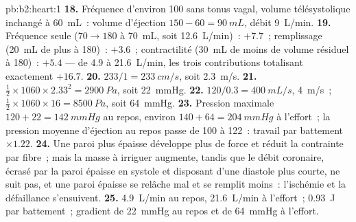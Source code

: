 \begin{solution}{pb:b2:heart:1}
\textbf{18.} Fréquence d'environ 100 sans tonus vagal, volume
télésystolique inchangé à \qty{60}{mL}~: volume d'éjection
$150 - 60 = \qty{90}{mL}$, débit \qty{9}{L/min}.
\textbf{19.} Fréquence seule ($70 \to 180$ à \qty{70}{mL}, soit
\qty{12.6}{L/min})~: $+7.7$~; remplissage (\qty{20}{mL} de plus à
180)~: $+3.6$~; contractilité (\qty{30}{mL} de moins de volume résiduel
à 180)~: $+5.4$ --- de 4.9 à \qty{21.6}{L/min}, les trois contributions
totalisant exactement $+16.7$.
\textbf{20.} $233/1 = \qty{233}{cm/s}$, soit \qty{2.3}{m/s}.
\textbf{21.} $\tfrac12\times 1060\times 2.33^{2} = \qty{2900}{Pa}$, soit
\qty{22}{mmHg}.
\textbf{22.} $120/0.3 = \qty{400}{mL/s}$, \qty{4}{m/s}~; $\tfrac12\times
1060\times 16 = \qty{8500}{Pa}$, soit \qty{64}{mmHg}.
\textbf{23.} Pression maximale $120 + 22 = \qty{142}{mmHg}$ au repos,
environ $140 +
64 = \qty{204}{mmHg}$ à l'effort~; la pression moyenne d'éjection au
repos passe de 100 à 122~: travail par battement $\times 1.22$.
\textbf{24.} Une paroi plus épaisse développe plus de force et réduit la
contrainte par fibre~; mais la masse à irriguer augmente, tandis que le
débit coronaire, écrasé par la paroi épaisse en systole et disposant
d'une diastole plus courte, ne suit pas, et une paroi épaisse se relâche
mal et se remplit moins~: l'ischémie et la défaillance s'ensuivent.
\textbf{25.} \qty{4.9}{L/min} au repos, \qty{21.6}{L/min} à l'effort~;
\qty{0.93}{J} par battement~; gradient de \qty{22}{mmHg} au repos et de
\qty{64}{mmHg} à l'effort.
\end{solution}
